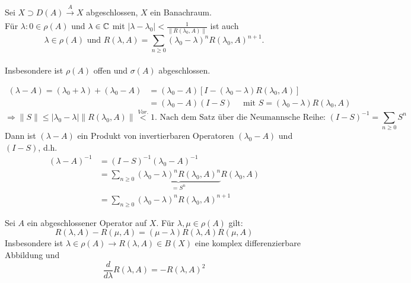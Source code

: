 \begin{satz}[Resolventendarstellung] \label{satz:13.4-Resolventendarstellung}
	Sei $X \supset D(A) \xrightarrow[]{A} X$ abgeschlossen, $X$ ein Banachraum. \\
	Für $\lambda:{0} \in \rho(A)$ und $\lambda \in \mathbb{C}$ mit $|\lambda - \lambda_{0}| < \frac{1}{\| R(\lambda_{0}, A) \|}$ ist auch \\
		\[ \lambda \in \rho(A) \text{ und } R(\lambda, A) = \sum_{n \geq 0} (\lambda_{0} - \lambda)^{n} R(\lambda_{0}, A)^{n + 1}. \] \\
	Insbesondere ist $\rho(A)$ offen und $\sigma(A)$ abgeschlossen.
\end{satz}

\begin{beweis}
	\begin{align*}
		 (\lambda - A) = (\lambda_{0} + \lambda) + (\lambda_{0} - A) & = (\lambda_{0} - A)\left[I - (\lambda_{0} - \lambda) R(\lambda_{0}, A)\right] \\
		 & = (\lambda_{0} - A)(I - S) \quad \text{ mit } S = (\lambda_{0} - \lambda)R(\lambda_{0}, A)
	\end{align*}	
	\[ \Rightarrow \| S \| \leq | \lambda_{0} - \lambda| \| R(\lambda_{0}, A) \| \overset{Vor.}{<} 1. \text{ Nach dem Satz über die Neumannsche Reihe: } (I - S)^{-1} = \sum_{n \geq 0} S^{n} \]
	Dann ist $(\lambda - A)$ ein Produkt von invertierbaren Operatoren $(\lambda_{0} - A)$ und $(I - S)$, d.h. 
	\begin{align*}
		(\lambda - A)^{-1} & = (I - S)^{-1}(\lambda_{0} - A)^{-1} \\
			& = \sum_{n \geq 0} \underbrace{(\lambda_{0} - \lambda)^{n}R(\lambda_{0}, A)^{n}}_{= S^{n}} R(\lambda_{0}, A) \\
			& = \sum_{n \geq 0} (\lambda_{0} - \lambda)^{n} R(\lambda_{0}, A)^{n + 1}
	\end{align*} 
\end{beweis}


\begin{satz}[Resolventengleichung] 
	Sei $A$ ein abgeschlossener Operator auf $X$. Für $\lambda, \mu \in \rho(A)$ gilt:
		\[ R(\lambda, A) - R(\mu, A) = (\mu - \lambda) R(\lambda, A) R(\mu, A) \]
	Insbesondere ist $\lambda \in \rho(A) \rightarrow R(\lambda, A) \in B(X)$ eine komplex differenzierbare Abbildung und 
		\[ \frac{d}{d \lambda} R(\lambda, A) = - R(\lambda, A)^{2} \]
\end{satz}

